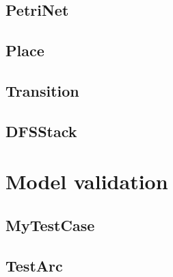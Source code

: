 \documentclass[a4paper]{article}
\begin{document}
\subsection{PetriNet}


\newpage

\subsection{Place}


\newpage

\subsection{Transition}


\newpage

\subsection{DFSStack}


\newpage

\section {Model validation}


\subsection{MyTestCase}


\newpage

\subsection{TestArc}

\end{document}
